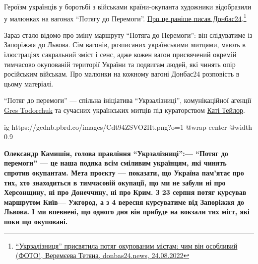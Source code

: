  
 
 
 
 

Героїзм українців у боротьбі з військами країни-окупанта художники відобразили
у малюнках на вагонах \enquote{Потягу до Перемоги}.
\href{https://donbas24.news/news/ukrzaliznicya-prisvyatila-potyag-okupovanim-mistam-cim-vin-osoblivii-foto}{Про
це раніше писав Донбас24}.\footnote{%
\href{https://donbas24.news/news/ukrzaliznicya-prisvyatila-potyag-okupovanim-mistam-cim-vin-osoblivii-foto}{\enquote{Укрзалізниця} присвятила потяг окупованим містам: чим він особливий (ФОТО), Веремєева Тетяна, donbas24.news, 24.08.2022}
}

Зараз стало відомо про зміну маршруту \enquote{Потяга до Перемоги}: він слідуватиме із
Запоріжжя до Львова. Сім вагонів, розписаних українськими митцями, мають в
ілюстраціях сакральний зміст і сенс, адже кожен вагон присвячений окремій
тимчасово окупованій території України та подвигам людей, які чинять опір
російським військам. Про малюнки на кожному вагоні Донбас24 розповість в цьому
матеріалі.


\enquote{Потяг до перемоги} — спільна ініціатива \enquote{Укрзалізниці}, комунікаційної агенції
\href{https://www.instagram.com/grestodorchuk}{Gres Todorchuk} та сучасних українських митців під кураторством 
\href{https://www.facebook.com/kateryna.taylor.5}{Каті Тейлор}. 

\ifcmt
  ig https://gcdnb.pbrd.co/images/Cdt94ZSVO2Ht.png?o=1
  @wrap center
  @width 0.9
\fi

\begin{leftbar}
	\begingroup
		\bfseries
Олександр Камишін, голова правління \enquote{Укрзалізниці}:— \enquote{Потяг до перемоги}
— це наша подяка всім сміливим українцям, які чинять спротив окупантам.
Мета проєкту — показати, що Україна пам'ятає про тих, хто знаходиться в
тимчасовій окупації, що ми не забули ні про Херсонщину, ні про
Донеччину, ні про Крим. З 23 серпня потяг курсував маршрутом Київ—
Ужгород, а з 4 вересня курсуватиме від Запоріжжя до Львова. І ми
впевнені, що одного дня він прибуде на вокзали тих міст, які поки що
окуповані.
	\endgroup
\end{leftbar}


